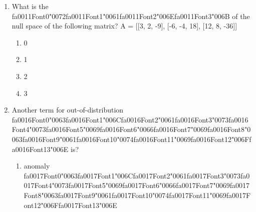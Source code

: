 \documentclass[{\csname fa0013Font0\endcsname\char"0030}{\csname fa0014Font0\endcsname\char"0033}pt]{article}
\begin{document}
\begin{enumerate}[label=\arabic*.]
\begin{enumerate}[label=(\alph*)]
    \item True, {\csname fa0007Font0\endcsname\char"0046}{\csname fa0007Font1\endcsname\char"0061}{\csname fa0007Font2\endcsname\char"006C}{\csname fa0007Font3\endcsname\char"0073}{\csname fa0007Font4\endcsname\char"0065}
    \item False, {\csname fa0008Font0\endcsname\char"0054}{\csname fa0008Font1\endcsname\char"0072}{\csname fa0008Font2\endcsname\char"0075}{\char"0065}
    \item True, {\csname fa0009Font0\endcsname\char"0054}{\csname fa0009Font1\endcsname\char"0072}{\csname fa0009Font2\endcsname\char"0075}{\char"0065}
    \item False, {\csname fa0010Font0\endcsname\char"0046}{\csname fa0010Font1\endcsname\char"0061}{\csname fa0010Font2\endcsname\char"006C}{\csname fa0010Font3\endcsname\char"0073}{\csname fa0010Font4\endcsname\char"0065}
\end{enumerate}
\item What is the {\csname fa0011Font0\endcsname\char"0072}{\csname fa0011Font1\endcsname\char"0061}{\csname fa0011Font2\endcsname\char"006E}{\csname fa0011Font3\endcsname\char"006B} of the null space of the following matrix? A = [[3, 2, -9], [-6, -4, 18], [12, 8, -36]]
\begin{enumerate}[label=(\alph*)]
    \item 0
    \item 1
    \item 2
    \item 3
\end{enumerate}
\item Another term for out-of-distribution {\csname fa0016Font0\endcsname\char"0063}{\csname fa0016Font1\endcsname\char"006C}{\csname fa0016Font2\endcsname\char"0061}{\csname fa0016Font3\endcsname\char"0073}{\csname fa0016Font4\endcsname\char"0073}{\csname fa0016Font5\endcsname\char"0069}{\csname fa0016Font6\endcsname\char"0066}{\csname fa0016Font7\endcsname\char"0069}{\csname fa0016Font8\endcsname\char"0063}{\csname fa0016Font9\endcsname\char"0061}{\csname fa0016Font10\endcsname\char"0074}{\csname fa0016Font11\endcsname\char"0069}{\csname fa0016Font12\endcsname\char"006F}{\csname fa0016Font13\endcsname\char"006E} is?
\begin{enumerate}[label=(\alph*)]
    \item anomaly {\csname fa0017Font0\endcsname\char"0063}{\csname fa0017Font1\endcsname\char"006C}{\csname fa0017Font2\endcsname\char"0061}{\csname fa0017Font3\endcsname\char"0073}{\csname fa0017Font4\endcsname\char"0073}{\csname fa0017Font5\endcsname\char"0069}{\csname fa0017Font6\endcsname\char"0066}{\csname fa0017Font7\endcsname\char"0069}{\csname fa0017Font8\endcsname\char"0063}{\csname fa0017Font9\endcsname\char"0061}{\csname fa0017Font10\endcsname\char"0074}{\csname fa0017Font11\endcsname\char"0069}{\csname fa0017Font12\endcsname\char"006F}{\csname fa0017Font13\endcsname\char"006E}

\end{enumerate}
\end{enumerate}
\end{document}
